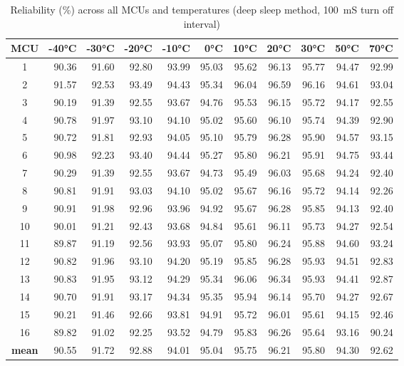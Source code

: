 \begin{table}[ht!]
    \centering
    \begin{tabular}{c||rrrrrrrrrr}
    \toprule
    \textbf{MCU} & \textbf{-40°C} & \textbf{-30°C} & \textbf{-20°C} & \textbf{-10°C} & \textbf{0°C} & \textbf{10°C} & \textbf{20°C} & \textbf{30°C} & \textbf{50°C} & \textbf{70°C} \\
    \midrule
    1    &  90.36 &  91.60 &  92.80 &  93.99 & 95.03 & 95.62 & 96.13 & 95.77 & 94.47 & 92.99 \\
    2    &  91.57 &  92.53 &  93.49 &  94.43 & 95.34 & 96.04 & 96.59 & 96.16 & 94.61 & 93.04 \\
    3    &  90.19 &  91.39 &  92.55 &  93.67 & 94.76 & 95.53 & 96.15 & 95.72 & 94.17 & 92.55 \\
    4    &  90.78 &  91.97 &  93.10 &  94.10 & 95.02 & 95.60 & 96.10 & 95.74 & 94.39 & 92.90 \\
    5    &  90.72 &  91.81 &  92.93 &  94.05 & 95.10 & 95.79 & 96.28 & 95.90 & 94.57 & 93.15 \\
    6    &  90.98 &  92.23 &  93.40 &  94.44 & 95.27 & 95.80 & 96.21 & 95.91 & 94.75 & 93.44 \\
    7    &  90.29 &  91.39 &  92.55 &  93.67 & 94.73 & 95.49 & 96.03 & 95.68 & 94.24 & 92.40 \\
    8    &  90.81 &  91.91 &  93.03 &  94.10 & 95.02 & 95.67 & 96.16 & 95.72 & 94.14 & 92.26 \\
    9    &  90.91 &  91.98 &  92.96 &  93.96 & 94.92 & 95.67 & 96.28 & 95.85 & 94.13 & 92.40 \\
    10   &  90.01 &  91.21 &  92.43 &  93.68 & 94.84 & 95.61 & 96.11 & 95.73 & 94.27 & 92.54 \\
    11   &  89.87 &  91.19 &  92.56 &  93.93 & 95.07 & 95.80 & 96.24 & 95.88 & 94.60 & 93.24 \\
    12   &  90.82 &  91.96 &  93.10 &  94.20 & 95.19 & 95.85 & 96.28 & 95.93 & 94.51 & 92.83 \\
    13   &  90.83 &  91.95 &  93.12 &  94.29 & 95.34 & 96.06 & 96.34 & 95.93 & 94.41 & 92.87 \\
    14   &  90.70 &  91.91 &  93.17 &  94.34 & 95.35 & 95.94 & 96.14 & 95.70 & 94.27 & 92.67 \\
    15   &  90.21 &  91.46 &  92.66 &  93.81 & 94.91 & 95.72 & 96.01 & 95.61 & 94.15 & 92.46 \\
    16   &  89.82 &  91.02 &  92.25 &  93.52 & 94.79 & 95.83 & 96.26 & 95.64 & 93.16 & 90.24 \\
    \textbf{mean} &  90.55 &  91.72 &  92.88 &  94.01 & 95.04 & 95.75 & 96.21 & 95.80 & 94.30 & 92.62 \\
    \bottomrule
    \end{tabular}
    \captionsetup{justification=centering,margin=0.5cm}
    \caption{Reliability (\%) across all MCUs and temperatures (deep sleep method, 100~mS turn off interval)}
    \label{table:reliability_deep_sleep}
\end{table}


